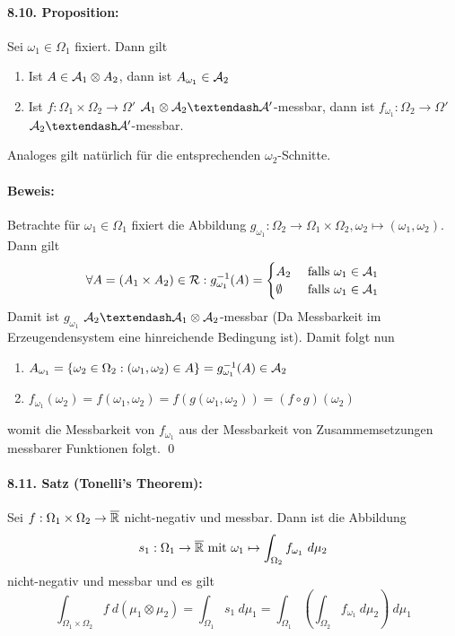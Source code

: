 \documentclass[11pt]{report}
\begin{document}
\paragraph{8.10. Proposition:}Sei $\omega_1\in\Omega_1$ fixiert. Dann gilt
\begin{enumerate}[label=(\roman*)]
    \item Ist $A\in\mathcal{A}_1\otimes A_2$, dann ist $A_{\omega_1}\in\mathcal{A}_2$
    \item Ist $f:\Omega_1\times\Omega_2\to\Omega'$ $\A_1\otimes\A_2\textendash\A'$-messbar, dann ist $f_{\omega_1}:\Omega_2\to\Omega'$ $\A_2\textendash\A'$-messbar.
\end{enumerate}
Analoges gilt nat\"urlich f\"ur die entsprechenden $\omega_2$-Schnitte.

\paragraph{Beweis:}Betrachte f\"ur $\omega_1\in\Omega_1$ fixiert die Abbildung $g_{\omega_1}:\Omega_2\to\Omega_1\times\Omega_2,\omega_2\mapsto(\omega_1,\omega_2)$. Dann gilt
\begin{align*}
    \forall A=(A_1\times A_2)\in\mathcal{R}:g_{\omega_1}^{-1}(A)=
    \begin{cases}
        A_2&\text{ falls }\omega_1\in\mathcal{A}_1\\
        \emptyset&\text{ falls }\omega_1\in\mathcal{A}_1
    \end{cases}
\end{align*}
Damit ist $g_{\omega_1}$ $\A_2\textendash\A_1\otimes\A_2$-messbar (Da Messbarkeit im Erzeugendensystem eine hinreichende Bedingung ist). Damit folgt nun
\begin{enumerate}[label=(\roman*)]
    \item $A_{\omega_1}=\left\{\omega_2\in\Omega_2:(\omega_1,\omega_2)\in A\right\}=g_{\omega_1}^{-1}(A)\in\mathcal{A}_2$
    \item $f_{\omega_1}(\omega_2)=f(\omega_1,\omega_2)=f(g(\omega_1,\omega_2))=(f\circ g)(\omega_2)$
\end{enumerate}
womit die Messbarkeit von $f_{\omega_1}$ aus der Messbarkeit von Zusammemsetzungen messbarer Funktionen folgt. \qed

\paragraph{8.11. Satz (Tonelli's Theorem):}Sei $f:\Omega_1\times\Omega_2\to\overline{\mathbb{R}}$ nicht-negativ und messbar. Dann ist die Abbildung
$$s_1:\Omega_1\to\overline{\mathbb{R}}\text{ mit }\omega_1\mapsto\int_{\Omega_2}f_{\omega_1}\ d\mu_2$$
nicht-negativ und messbar und es gilt
$$\int_{\Omega_1\times\Omega_2}f \ d(\mu_1\otimes\mu_2)=\int_{\Omega_1}s_1\ d\mu_1=\int_{\Omega_1}\left(\int_{\Omega_2}f_{\omega_1}\ d\mu_2\right)\ d\mu_1$$
\end{document}
